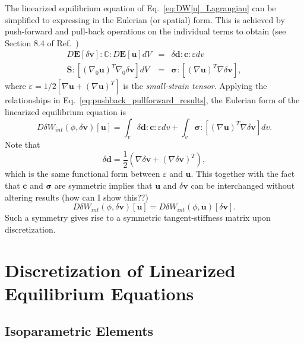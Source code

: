 The linearized equilibrium equation of Eq.\ \eqref{eq:DW[u]_Lagrangian} can be simplified to expressing in the Eulerian (or spatial) form. This is achieved by push-forward and pull-back operations on the individual terms to obtain (see Section 8.4 of Ref.\ \cite{JavierBonet:2008uxa})
%
\begin{eqnarray}
D\pmb{E}[\delta\pmb{v}] :\pmb{\mathbb{C}}:D\pmb{E}[\pmb{u}]dV &=& \delta \pmb{d}:\pmb{c}:\varepsilon dv \nonumber\\
%
\pmb{S}: [(\nabla_0 \pmb{u})^T \nabla_0\delta \pmb{v}]dV &=& \pmb{\sigma}:[(\nabla \pmb{u})^T\nabla \delta \pmb{v}],
\label{eq:pushback_pullforward_results}
\end{eqnarray}
%
where $\varepsilon = 1/2[\nabla \pmb{u} + (\nabla \pmb{u})^T]$ is the \textit{small-strain tensor}. Applying the relationships in Eq.\ \eqref{eq:pushback_pullforward_results}, the Eulerian form of the linearized equilibrium equation is
%
\begin{equation}
D\delta W_{int}(\phi,\delta \pmb{v})[\pmb{u}] = \int_v \delta \pmb{d}:\pmb{c}:\varepsilon dv + \int_v \pmb{\sigma}:[(\nabla \pmb{u})^T\nabla \delta \pmb{v}]dv.
\label{eq:DW[u]_Eulerian}
\end{equation}
%
Note that 
%
\begin{equation}
\delta \pmb{d} = \frac{1}{2}(\nabla \delta \pmb{v} + (\nabla \delta \pmb{v})^T),
\end{equation}
%
which is the same functional form between $\varepsilon$ and $\pmb{u}$. This together with the fact that $\pmb{c}$ and $\pmb{\sigma}$ are symmetric implies that $\pmb{u}$ and $\delta \pmb{v}$ can be interchanged without altering results (how can I show this??)
%
\begin{equation}
D\delta W_{int}(\phi,\delta \pmb{v})[\pmb{u}] = D\delta W_{int}(\phi,\pmb{u})[\delta \pmb{v}] .
\end{equation}
%
Such a symmetry gives rise to a symmetric tangent-stiffness matrix upon discretization.

\section{Discretization of Linearized Equilibrium Equations}

\subsection{Isoparametric Elements}

